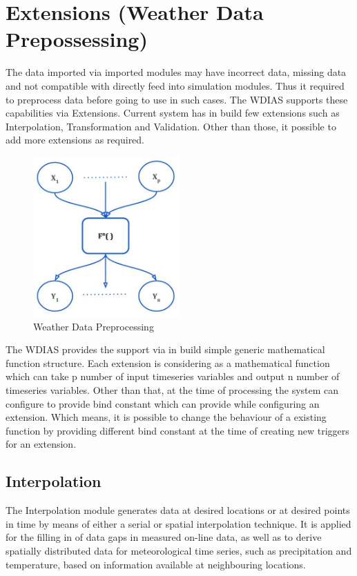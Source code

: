 \section{Extensions (Weather Data Prepossessing)}

The data imported via imported modules may have incorrect data, missing data and not compatible with directly feed into simulation modules. 
Thus it required to preprocess data before going to use in such cases. The WDIAS supports these capabilities via Extensions. Current system has
in build few extensions such as Interpolation, Transformation and Validation. Other than those, it possible to add more extensions as required.
\begin{figure}[htp]
    \centering
    \includegraphics[width=0.5\textwidth]{method/data_preprocess/weather_data_preprocessing.jpg}
    \caption{Weather Data Preprocessing}
    \label{fig:weather_data_preprocessing}
\end{figure}
The WDIAS provides the support via in build simple generic mathematical function structure. Each extension is considering as a mathematical function which can take p 
number of input timeseries variables and output n number of timeseries variables. Other than that, at the time of processing the system can configure to provide
bind constant which can provide while configuring an extension. Which means, it is possible to change the behaviour of a existing function by providing different bind
constant at the time of creating new triggers for an extension.

\subsection{Interpolation}
The Interpolation module generates data at desired locations or at desired points in time by means of either a serial or spatial interpolation technique. It is applied for the filling in of data gaps in measured on-line data, as well as to derive spatially distributed data for meteorological time series, such as precipitation and temperature, based on information available at neighbouring locations.

